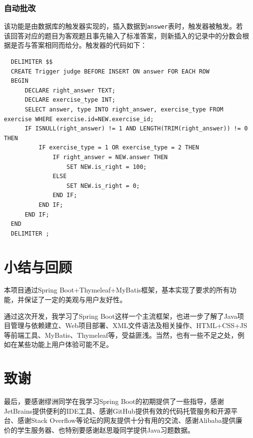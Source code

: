 \documentclass{nwafucoursepaper}
\begin{document}
\subsubsection{自动批改}

该功能是由数据库的触发器实现的，插入数据到\verb|answer|表时，触发器被触发。若该回答对应的题目为客观题且事先输入了标准答案，则新插入的记录中的分数会根据是否与答案相同而给分。触发器的代码如下：
\lstset{language=sql}
\begin{lstlisting}
  DELIMITER $$
  CREATE Trigger judge BEFORE INSERT ON answer FOR EACH ROW
  BEGIN
      DECLARE right_answer TEXT;
      DECLARE exercise_type INT;
      SELECT answer, type INTO right_answer, exercise_type FROM exercise WHERE exercise.id=NEW.exercise_id;
      IF ISNULL(right_answer) != 1 AND LENGTH(TRIM(right_answer)) != 0 THEN
          IF exercise_type = 1 OR exercise_type = 2 THEN
              IF right_answer = NEW.answer THEN
                  SET NEW.is_right = 100;
              ELSE
                  SET NEW.is_right = 0;
              END IF;
          END IF;
      END IF;
  END
  DELIMITER ;
\end{lstlisting}

\section{小结与回顾}

本项目通过Spring Boot+Thymeleaf+MyBatis框架，基本实现了要求的所有功能，并保证了一定的美观与用户友好性。

通过这次开发，我学习了Spring Boot这样一个主流框架，也进一步了解了Java项目管理与依赖建立、Web项目部署、XML文件语法及相关操作、HTML+CSS+JS等前端工具、MyBatis、Thymeleaf等，受益匪浅。当然，也有一些不足之处，例如在某些功能上用户体验可能不足。

\section{致谢}

最后，要感谢缪洲同学在我学习Spring Boot的初期提供了一些指导，感谢JetBrains提供便利的IDE工具、感谢GitHub提供有效的代码托管服务和开源平台、感谢Stack Overflow等论坛的网友提供十分有用的交流、感谢Alibaba提供廉价的学生服务器、也特别要感谢赵思璇同学提供Java习题数据。

\end{document}
